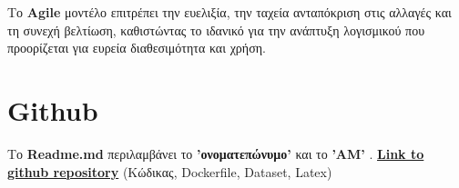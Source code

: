 \documentclass{article}
\begin{document}
Το \textbf{Agile} μοντέλο επιτρέπει την ευελιξία, την ταχεία ανταπόκριση στις αλλαγές και τη συνεχή βελτίωση, καθιστώντας το ιδανικό για την ανάπτυξη λογισμικού που προορίζεται για ευρεία διαθεσιμότητα και χρήση.
% 
\section{Github}
Tο \textbf{Readme.md} περιλαμβάνει το \textbf{'ονοματεπώνυμο'} και το \textbf{'ΑΜ'} .
\newline
\href{https://github.com/mikezois1992/algorithms_ml}{\textbf{Link to github repository}} (Κώδικας, Dockerfile, Dataset, Latex)
\end{document}
